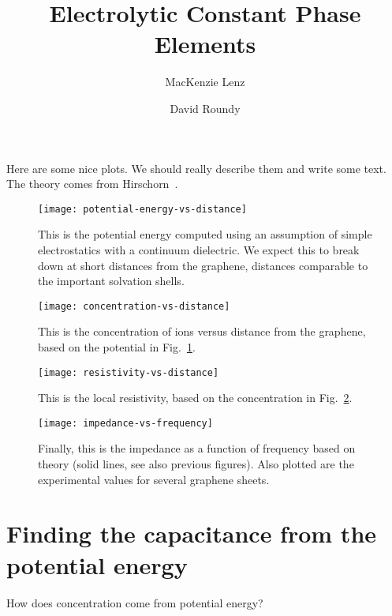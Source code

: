 \documentclass[twocolumn]{revtex4-1}
\begin{document}
\title{Electrolytic Constant Phase Elements}
\author{MacKenzie Lenz}
\author{David Roundy}


\maketitle

Here are some nice plots.  We should really describe them and write
some text.  The theory comes from
Hirschorn~\cite{hirschorn2010constant}.

\begin{figure}
  \texttt{[image: potential-energy-vs-distance]}
  \caption{This is the potential energy computed using an assumption
    of simple electrostatics with a continuum dielectric.  We expect
    this to break down at short distances from the graphene, distances
    comparable to the important solvation shells.}
  \label{fig:pot}
\end{figure}

\begin{figure}
  \texttt{[image: concentration-vs-distance]}
  \caption{This is the concentration of ions versus distance from the
    graphene, based on the potential in Fig.~\ref{fig:pot}.}
  \label{fig:concentration}
\end{figure}

\begin{figure}
  \texttt{[image: resistivity-vs-distance]}
  \caption{This is the local resistivity, based on the concentration
    in Fig.~\ref{fig:concentration}.}
\end{figure}

\begin{figure}
  \texttt{[image: impedance-vs-frequency]}
  \caption{Finally, this is the impedance as a function of frequency
    based on theory (solid lines, see also previous figures).  Also
    plotted are the experimental values for several graphene sheets.}
\end{figure}

\afterpage{\clearpage}

\clearpage

\section{Finding the capacitance from the potential energy}

How does concentration come from potential energy?
\end{document}

